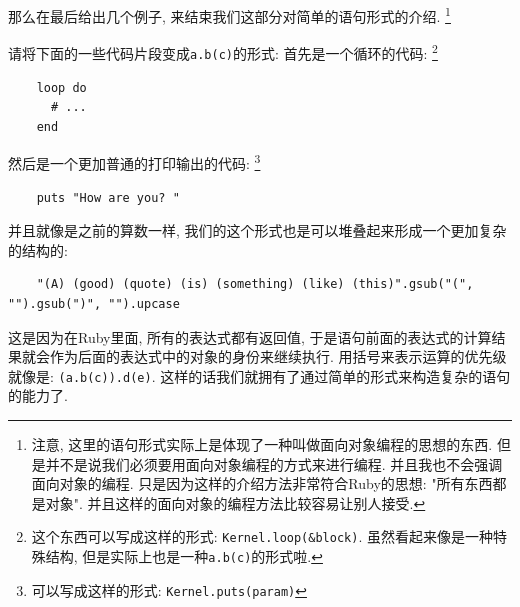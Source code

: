 那么在最后给出几个例子, 来结束我们这部分对简单的语句形式的介绍. \footnote{注意, 这里的语句形式实际上是体现了一种叫做面向对象编程的思想的东西. 但是并不是说我们必须要用面向对象编程的方式来进行编程. 并且我也不会强调面向对象的编程. 只是因为这样的介绍方法非常符合Ruby的思想: "所有东西都是对象". 并且这样的面向对象的编程方法比较容易让别人接受. }

\begin{example}
  请将下面的一些代码片段变成\texttt{a.b(c)}的形式: 
  首先是一个循环的代码: \footnote{这个东西可以写成这样的形式: \texttt{Kernel.loop(&block)}. 虽然看起来像是一种特殊结构, 但是实际上也是一种\texttt{a.b(c)}的形式啦. }
  \begin{verbatim}
    loop do
      # ...
    end
  \end{verbatim}
  
  然后是一个更加普通的打印输出的代码: \footnote{可以写成这样的形式: \texttt{Kernel.puts(param)}}
  \begin{verbatim}
    puts "How are you? "
  \end{verbatim}

  并且就像是之前的算数一样, 我们的这个形式也是可以堆叠起来形成一个更加复杂的结构的: 
  \begin{verbatim}
    "(A) (good) (quote) (is) (something) (like) (this)".gsub("(", "").gsub(")", "").upcase
  \end{verbatim}

  这是因为在Ruby里面, 所有的表达式都有返回值, 于是语句前面的表达式的计算结果就会作为后面的表达式中的对象的身份来继续执行. 用括号来表示运算的优先级就像是: \texttt{(a.b(c)).d(e)}. 这样的话我们就拥有了通过简单的形式来构造复杂的语句的能力了. 
\end{example}

